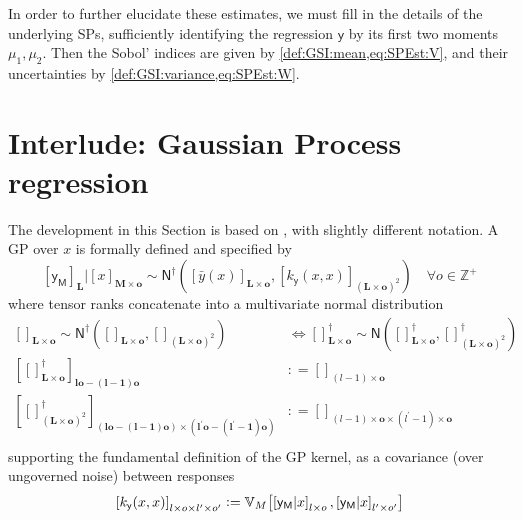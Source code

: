 \documentclass[preprint,12pt]{elsarticle}
\newcommand*{\M}[1]{\ensuremath{#1}\xspace}
\newcommand*{\x}{\times}
\newcommand*{\mi}[1]{\mathbf{#1}}
\newcommand*{\st}[1]{\mathbb{#1}}
\newcommand*{\rv}[1]{\mathsf{#1}}
\newcommand*{\te}[2][]{\left\lbrack{#2}\right\rbrack_{#1}}
\newcommand*{\deq}{\M{\mathrel{\mathop:}=}}
\newcommand*{\cov}[3][]{\ifthenelse{\equal{#1}{}}{\mathbb{V}_{#3}\!\left\lbrack{#2}\right\rbrack}{\mathbb{V}_{#3}\!\left\lbrack{#2,#1}\right\rbrack}}
\newcommand*{\gauss}[2]{\mathsf{N}\!\left({#1,#2}\right)}
\newcommand*{\gaussd}[2]{\mathsf{N}^{\dagger}\!\left({#1,#2}\right)}
\begin{document}
    In order to further elucidate these estimates, we must fill in the details of the underlying SPs, sufficiently identifying the regression $\rv{y}$ by its first two moments $\mu_{1}, \mu_{2}$. Then the Sobol' indices are given by \cref{def:GSI:mean,eq:SPEst:V}, and their uncertainties by \cref{def:GSI:variance,eq:SPEst:W}.


\section{Interlude: Gaussian Process regression} \label{sec:GPR}
    The development in this Section is based on \cite{Alvarez.etal2011}, with slightly different notation. A GP over $x$ is formally defined and specified by
    \begin{equation*}
        \te[\mi{L}]{\rv{y_M}} \big\vert \te[\mi{M}\x\mi{o}]{x} \sim 
        \gaussd{\te[\mi{L}\x\mi{o}]{\bar{y}(x)}}{\te[(\mi{L}\x\mi{o})^{2}]
        {k_{\rv{y}}(x,x)}} \quad \forall o \in \st{Z^{+}}
    \end{equation*}
    where tensor ranks concatenate into a multivariate normal distribution
    \begin{equation*}
        \begin{aligned}
            \te[\mi{L}\x\mi{o}]{} \sim \gaussd{\te[\mi{L}\x\mi{o}]{}}{\te[(\mi{L\x o})^{2}]{}}
            & \Longleftrightarrow
            \te[\mi{L}\x\mi{o}]{}^{\dagger} \sim \gauss{\te[\mi{L}\x\mi{o}]{}^{\dagger}}{\te[(\mi{L\x o})^{2}]{}^{\dagger}} \\
            \te[\mi{lo}-\mi{(l-1)o}]{\te[\mi{L}\x\mi{o}]{}^{\dagger}} 
            &\deq \te[(l-1)\x\mi{o}]{} \\
            \te[(\mi{lo}-(\mi{l-1})\mi{o}) \x (\mi{l^{\prime}o}-\mi{(l^{\prime}-1)o})]
            {\te[(\mi{L\x o})^{2}]{}^{\dagger}} 
            &\deq \te[(l-1)\x\mi{o} \x (l^{\prime}-1)\x\mi{o}]{} \\
        \end{aligned}
    \end{equation*}
    supporting the fundamental definition of the GP kernel, as a covariance (over ungoverned noise) between responses
    \begin{equation*}
        \te[l\x o\x l^{\prime}\x o^{\prime}]{k_{\rv{y}}(x,x)} 
        \deq \cov[{\te[l^{\prime}\x o^{\prime}]{\rv{y_M}\vert x}}]{\te[l\x o]{\rv{y_M}\vert x}}{M}
    \end{equation*}
\end{document}
